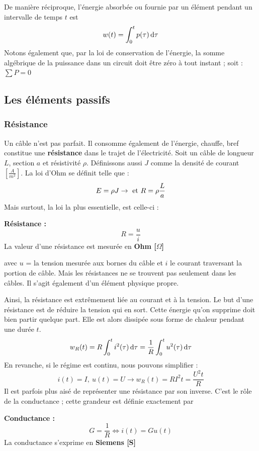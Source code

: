 \documentclass[12pt,a4paper]{article}
\begin{document}
De manière réciproque, l'énergie absorbée ou fournie par un élément pendant un intervalle de temps $t$ est 
\begin{equation}
	w(t) = \int_0^t p(\tau)\, \mathrm d \tau
	\label{equ: definition energie}
\end{equation}
Notons également que, par la loi de conservation de l'énergie, la somme algébrique de la puissance dans un circuit doit être zéro à tout instant ; soit : $\sum P = 0$

\subsection{Les éléments passifs}
\label{subsection: elements passifs}
\subsubsection{Résistance}
\label{subsubsection : resistance}
Un câble n'est pas parfait. Il consomme également de l'énergie, chauffe, bref constitue une \textbf{résistance} dans le trajet de l'électricité. Soit un câble de longueur $L$, section $a$ et résistivité $\rho$. Définissons aussi $J$ comme la densité de courant $\left[\frac{A}{m^2}\right]$. La loi d'Ohm se définit telle que :
\begin{equation}
	E = \rho J \to \mbox{ et } R = \rho \frac{L}{a}
	\label{equ: Ohm}
\end{equation}
Mais surtout, la loi la plus essentielle, est celle-ci :
\begin{boite}[0.7]
	\textbf{Résistance :}
	\begin{equation}
		R = \frac{u}{i}
		\label{equ: URI}
	\end{equation}
	La valeur d'une résistance est mesurée en \textbf{Ohm [$\Omega$]}
\end{boite}
avec $u$ = la tension mesurée aux bornes du câble et $i$ le courant traversant la portion de câble. Mais les résistances ne se trouvent pas seulement dans les câbles. Il s'agit également d'un élément physique propre. 

Ainsi, la résistance est extrêmement liée au courant et à la tension. Le but d'une résistance est de réduire la tension qui en sort. Cette énergie qu'on supprime doit bien partir quelque part. Elle est alors dissipée sous forme de chaleur pendant une durée $t$. 
\[w_R(t) =  R  \int_0^t i^2(\tau) \, \mathrm d \tau = \frac{1}{R}\int_0^tu^2(\tau)\, \mathrm d \tau\]
En revanche, si le régime est continu, nous pouvons simplifier : 
\[i(t) = I,\ u(t) = U \to w_R(t) = RI^2t = \frac{U^2t}{R}\]
Il est parfois plus aisé de représenter une résistance par son inverse. C'est le rôle de la conductance ; cette grandeur est définie exactement par 
\begin{boite}
	\textbf{Conductance :}
	\begin{equation}
		G = \frac{1}{R} \iff i(t) = Gu(t)
	\end{equation}
	La conductance s'exprime en \textbf{Siemens [S]}
\end{boite}
\end{document}
